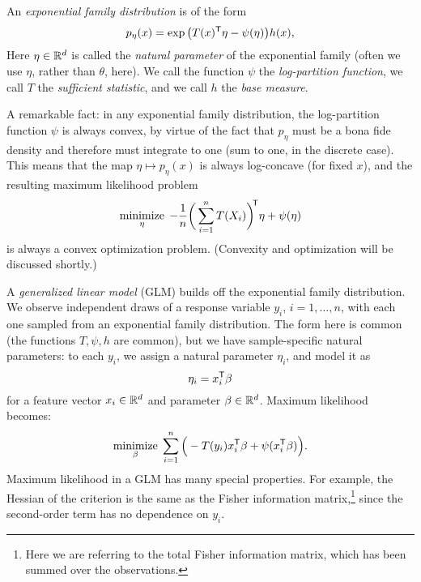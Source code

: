 \documentclass{article}
\begin{document}
An \emph{exponential family distribution} is of the form
\[
p_\eta(x) = \exp\big(T(x)^{\mathsf{T}} \eta - \psi(\eta)\big) h(x),
\]
Here $\eta \in \mathbb{R}^d$ is called the \emph{natural parameter} of the exponential  
family (often we use $\eta$, rather than $\theta$, here). We call the function
$\psi$ the \emph{log-partition function}, we call $T$ the \emph{sufficient
  statistic}, and we call $h$ the \emph{base measure}. 

A remarkable fact: in any exponential family distribution, the log-partition
function $\psi$ is always convex, by virtue of the fact that $p_\eta$ must be a
bona fide density and therefore must integrate to one (sum to one, in the
discrete case). This means that the map $\eta \mapsto p_\eta(x)$ is always
log-concave (for fixed $x$), and the resulting maximum likelihood problem       
\[
\mathop{\mathrm{minimize}}_\eta \; -\frac{1}{n} \bigg( \sum_{i=1}^n T(X_i) \bigg)^{\hspace{-2pt}
  \mathsf{T}} \eta + \psi(\eta)    
\]
is always a convex optimization problem. (Convexity and optimization will be
discussed shortly.) 

A \emph{generalized linear model} (GLM) builds off the exponential family
distribution. We observe independent draws of a response variable $y_i$,
$i=1,\dots,n$, with each one sampled from an exponential family
distribution. The form here is common (the functions $T, \psi, h$ are common),
but we have sample-specific natural parameters: to each $y_i$, we assign a
natural parameter $\eta_i$, and model it as  
\[
\eta_i = x_i^{\mathsf{T}} \beta
\] 
for a feature vector $x_i \in \mathbb{R}^d$ and parameter $\beta \in \mathbb{R}^d$. Maximum
likelihood becomes:   
\[
\mathop{\mathrm{minimize}}_\beta \; \sum_{i=1}^n \Big( -T(y_i) x_i^{\mathsf{T}} \beta + \psi(x_i^{\mathsf{T}} \beta)
\Big).  
\]
Maximum likelihood in a GLM has many special properties. For example, the
Hessian of the criterion is the same as the Fisher information
matrix,\footnote{Here we are referring to the total Fisher information matrix,
  which has been summed over the observations.} 
since the second-order term has no dependence on $y_i$. 
\end{document}
